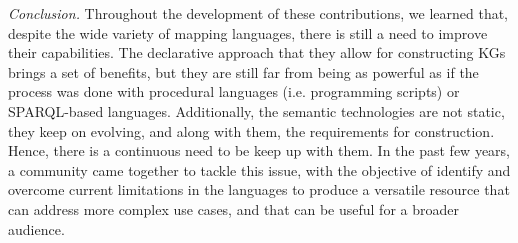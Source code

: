 \begin{itemize}
    \textit{Conclusion.} Throughout the development of these contributions, we learned that, despite the wide variety of mapping languages, there is still a need to improve their capabilities. The declarative approach that they allow for constructing KGs brings a set of benefits, but they are still far from being as powerful as if the process was done with procedural languages (i.e. programming scripts) or SPARQL-based languages. Additionally, the semantic technologies are not static, they keep on evolving, and along with them, the requirements for construction. Hence, there is a continuous need to be keep up with them. In the past few years, a community came together to tackle this issue, with the objective of identify and overcome current limitations in the languages to produce a versatile resource that can address more complex use cases, and that can be useful for a broader audience. %
\end{itemize}





